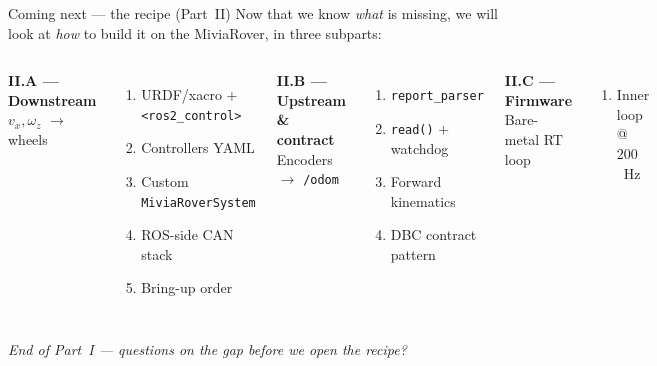 \begin{frame}{Coming next — the recipe (Part~II)}
  Now that we know \emph{what} is missing, we will look at \emph{how} to
  build it on the MiviaRover, in three subparts:
  \vspace{0.6em}

  \begin{columns}[T,onlytextwidth]
      \textbf{II.A — Downstream}\\
      \footnotesize\textcolor{black!60}{\(v_x,\omega_z\) $\to$ wheels}
      \begin{enumerate}\setlength\itemsep{2pt}
        \item URDF/xacro \(+\) \texttt{<ros2\_control>}
        \item Controllers YAML
        \item Custom \texttt{MiviaRoverSystem}
        \item ROS-side CAN stack
        \item Bring-up order
      \end{enumerate}

      \textbf{II.B — Upstream \& contract}\\
      \footnotesize\textcolor{black!60}{Encoders $\to$ \texttt{/odom}}
      \begin{enumerate}\setlength\itemsep{2pt}
        \item \texttt{report\_parser}
        \item \texttt{read()} \(+\) watchdog
        \item Forward kinematics
        \item DBC contract pattern
      \end{enumerate}

      \textbf{II.C — Firmware}\\
      \footnotesize\textcolor{black!60}{Bare-metal RT loop}
      \begin{enumerate}\setlength\itemsep{2pt}
        \item Inner loop @ \(200\)~Hz
      \end{enumerate}
  \end{columns}

  \vspace{1.0em}
  \centering
  \alert{\textit{End of Part~I — questions on the gap before we open the recipe?}}
\end{frame}
